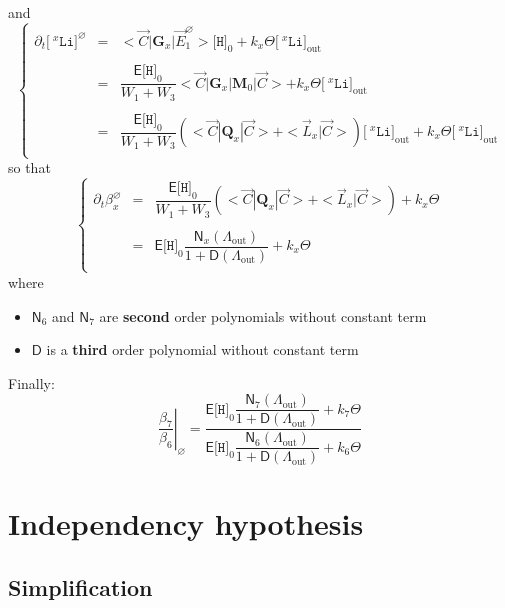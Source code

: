 \documentclass[aps,onecolumn,11pt]{revtex4}
\newcommand{\mychem}[1]{\mathtt{#1}}
\newcommand{\myconc}[1]{\big[#1\big]}
\newcommand{\spLi}[1]{{\!~^{#1}\mychem{Li}}}
\newcommand{\Li}[1]{\myconc{\spLi{#1}}}
\newcommand{\spproton}{\mychem{H}}
\newcommand{\proton}{\myconc{\spproton}}
\newcommand{\myout}[1]{{#1}_{\mathrm{out}}}
\newcommand{\mymat}[1]{{\bm{#1}}}
\newcommand{\LiAll}{\Lambda}
\newcommand{\LiAllOut}{\myout{\LiAll}}
\begin{document}
and
\begin{equation}
\left\lbrace
\begin{array}{rcl}
	\partial_t \Li{x}^\varnothing & = & <\vec{C}|\mymat{G}_x|\vec{E}_1^\varnothing> \proton_0 + k_x \Theta \myout{\Li{x}}\\
	\\
	 & = & \dfrac{\mathsf{E}\proton_0}{W_1+W_3} <\vec{C}|\mymat{G}_x|\mymat{M}_0|\vec{C}> + k_x \Theta \myout{\Li{x}}\\
	 \\
	 & = & \dfrac{\mathsf{E}\proton_0}{W_1+W_3} \left( <\vec{C}|\mymat{Q}_x|\vec{C}> + <\vec{L}_x|\vec{C}>\right)\myout{\Li{x}} + k_x \Theta \myout{\Li{x}}  \\
\end{array}
\right.
\end{equation}
so that
\begin{equation}
\left\lbrace
\begin{array}{rcl}
\partial_t \beta_x^\varnothing & = & \dfrac{\mathsf{E}\proton_0}{W_1+W_3} \left( <\vec{C}|\mymat{Q}_x|\vec{C}> + <\vec{L}_x|\vec{C}>\right) + k_x \Theta \\
\\
& = & \mathsf{E}\proton_0 \dfrac{\mathsf{N}_x(\LiAllOut)}{1+\mathsf{D}(\LiAllOut)} + k_x \Theta \\
\end{array}
\right.
\end{equation}
where 
\begin{itemize}
\item ${\mathsf{N}_6}$ and  ${\mathsf{N}_7}$ are  {\bf second} order polynomials without constant term
\item ${\mathsf{D}}$ is a {\bf third } order polynomial without constant term
\end{itemize}
Finally:
\begin{equation}
\left.\dfrac{\beta_7}{\beta_6}\right\vert_{\varnothing} = 
\dfrac{
\mathsf{E}\proton_0 \dfrac{\mathsf{N}_7(\LiAllOut)}{1+\mathsf{D}(\LiAllOut)} + k_7 \Theta 
}
{
\mathsf{E}\proton_0 \dfrac{\mathsf{N}_6(\LiAllOut)}{1+\mathsf{D}(\LiAllOut)} + k_6 \Theta 
}
\end{equation}

\section{Independency hypothesis}
\subsection{Simplification}
\end{document}
